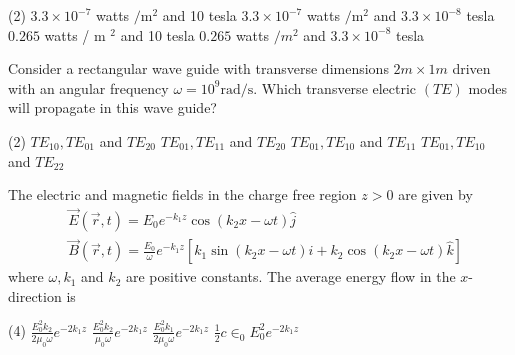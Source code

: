 \begin{enumerate}
\begin{minipage}{\textwidth}
\end{minipage}
\begin{tasks}(2)
	\task[\textbf{A.}] $3.3 \times 10^{-7}$ watts $/ \mathrm{m}^{2}$ and 10 tesla
	\task[\textbf{B.}]$3.3 \times 10^{-7}$ watts $/ \mathrm{m}^{2}$ and $3.3 \times 10^{-8}$ tesla
	\task[\textbf{C.}]$0.265$ watts / m $^{2}$ and 10 tesla
	\task[\textbf{D.}]$0.265$ watts $/ m^{2}$ and $3.3 \times 10^{-8}$ tesla	
\end{tasks}
\begin{minipage}{\textwidth}
	\item Consider a rectangular wave guide with transverse dimensions $2 m \times 1 m$ driven with an angular frequency $\omega=10^{9} \mathrm{rad} / \mathrm{s}$. Which transverse electric $(T E)$ modes will propagate in this wave guide?
\end{minipage}
\begin{tasks}(2)
	\task[\textbf{A.}] $T E_{10}, T E_{01}$ and $T E_{20}$
	\task[\textbf{B.}]$T E_{01}, T E_{11}$ and $T E_{20}$
	\task[\textbf{C.}]$T E_{01}, T E_{10}$ and $T E_{11}$
	\task[\textbf{D.}]$T E_{01}, T E_{10}$ and $T E_{22}$
\end{tasks}
\begin{minipage}{\textwidth}
	\item The electric and magnetic fields in the charge free region $z>0$ are given by
	$$
	\begin{aligned}
	&\vec{E}(\vec{r}, t)=E_{0} e^{-k_{1} z} \cos \left(k_{2} x-\omega t\right) \hat{j} \\
	&\vec{B}(\vec{r}, t)=\frac{E_{0}}{\omega} e^{-k_{1} z}\left[k_{1} \sin \left(k_{2} x-\omega t\right) \hat{i}+k_{2} \cos \left(k_{2} x-\omega t\right) \hat{k}\right]
	\end{aligned}
	$$
	where $\omega, k_{1}$ and $k_{2}$ are positive constants. The average energy flow in the $x$-direction is
\end{minipage}
\begin{tasks}(4)
	\task[\textbf{A.}] $\frac{E_{0}^{2} k_{2}}{2 \mu_{0} \omega} e^{-2 k_{1} z}$
	\task[\textbf{B.}]$\frac{E_{0}^{2} k_{2}}{\mu_{0} \omega} e^{-2 k_{1} z}$
	\task[\textbf{C.}]$\frac{E_{0}^{2} k_{1}}{2 \mu_{0} \omega} e^{-2 k_{1} z}$
	\task[\textbf{D.}]$\frac{1}{2} c \in_{0} E_{0}^{2} e^{-2 k_{1} z}$
\end{tasks}


\end{enumerate}
